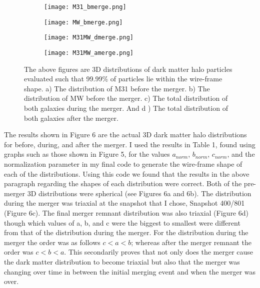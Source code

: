\documentclass{aastex63}
\begin{document}
\begin{figure}[h]
\centering
\begin{subfigure}{0.35\textwidth}
\centering
\texttt{[image: M31\_bmerge.png]}
\caption{\label{fig:6a}}
\end{subfigure}
\begin{subfigure}{0.35\textwidth}
\texttt{[image: MW\_bmerge.png]}
\caption{\label{fig:6b}}
\end{subfigure}
\begin{subfigure}{0.35\textwidth}
\texttt{[image: M31MW\_dmerge.png]}
\caption{\label{fig:6c}}
\end{subfigure}
\begin{subfigure}{0.35\textwidth}
\texttt{[image: M31MW\_amerge.png]}
\caption{\label{fig:6d}}
\end{subfigure}
\caption{The above figures are 3D distributions of dark matter halo particles evaluated such that 99.99\% of particles lie within the wire-frame shape. a) The distribution of M31 before the merger. b) The distribution of MW before the merger. c) The total distribution of both galaxies during the merger. And d ) The total distribution of both galaxies after the merger.}

\end{figure}
The results shown in Figure 6 are the actual 3D dark matter halo distributions for before, during, and after the merger. I used the results in Table 1, found using graphs such as those shown in Figure 5, for the values $a_{norm}$, $b_{norm}$, $c_{norm}$, and the normalization parameter in my final code to generate the wire-frame shape of each of the distributions. Using this code we found that the results in the above paragraph regarding the shapes of each distribution were correct. Both of the pre-merger 3D distributions were spherical (see Figures 6a and 6b). The distribution during the merger was triaxial at the snapshot that I chose, Snapshot 400/801 (Figure 6c). The final merger remnant distribution was also triaxial (Figure 6d) though which values of a, b, and c were the biggest to smallest were different from that of the distribution during the merger. For the distribution during the merger the order was as follows $c<a<b$; whereas after the merger remnant the order was $c<b<a$. This secondarily proves that not only does the merger cause the dark matter distribution to become triaxial but also that the merger was changing over time in between the initial merging event and when the merger was over.
\end{document}
